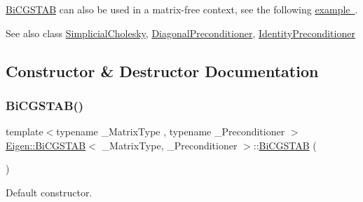 \mbox{\hyperlink{class_eigen_1_1_bi_c_g_s_t_a_b}{Bi\+C\+G\+S\+T\+AB}} can also be used in a matrix-\/free context, see the following \mbox{\hyperlink{}{example }}.

\begin{DoxySeeAlso}{See also}
class \mbox{\hyperlink{class_eigen_1_1_simplicial_cholesky}{Simplicial\+Cholesky}}, \mbox{\hyperlink{class_eigen_1_1_diagonal_preconditioner}{Diagonal\+Preconditioner}}, \mbox{\hyperlink{class_eigen_1_1_identity_preconditioner}{Identity\+Preconditioner}} 
\end{DoxySeeAlso}


\subsection{Constructor \& Destructor Documentation}
\mbox{\label{class_eigen_1_1_bi_c_g_s_t_a_b_ae1a0df6ef6e947256c3cb83ce7df7eda}} 
\subsubsection{\texorpdfstring{BiCGSTAB()}{BiCGSTAB()}\hspace{0.1cm}{\footnotesize\ttfamily [1/2]}}
{\footnotesize\ttfamily template$<$typename \+\_\+\+Matrix\+Type , typename \+\_\+\+Preconditioner $>$ \\
\mbox{\hyperlink{class_eigen_1_1_bi_c_g_s_t_a_b}{Eigen\+::\+Bi\+C\+G\+S\+T\+AB}}$<$ \+\_\+\+Matrix\+Type, \+\_\+\+Preconditioner $>$\+::\mbox{\hyperlink{class_eigen_1_1_bi_c_g_s_t_a_b}{Bi\+C\+G\+S\+T\+AB}} (\begin{DoxyParamCaption}{ }\end{DoxyParamCaption})\hspace{0.3cm}{\ttfamily [inline]}}

Default constructor. \mbox{\label{class_eigen_1_1_bi_c_g_s_t_a_b_a5842afd9566e254bc727de1fd7f46362}} 
